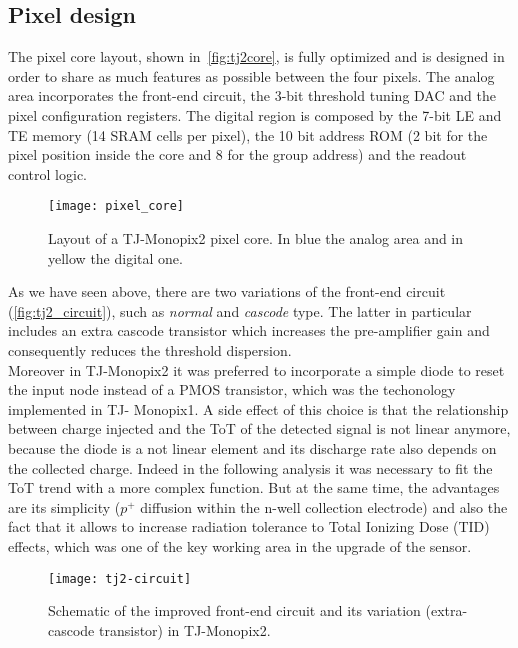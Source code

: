 
\subsection{Pixel design}\label{sec:improved_circuit}

The  pixel core layout, shown in~\autoref{fig:tj2core}, is fully optimized and is designed in order to share as much features as possible between the four pixels. The analog area incorporates the front-end circuit, the 3-bit threshold tuning DAC and the pixel configuration registers. The digital region is composed by the 7-bit LE and TE memory (14 SRAM cells per pixel), the 10 bit address ROM (2 bit for the pixel position inside the core and 8 for the group address) and the readout control logic. 

\begin{figure}[h!]
\centering
\texttt{[image: pixel\_core]}
\caption{Layout of a TJ-Monopix2  pixel core. In blue the analog area and in yellow the digital one.}
\label{fig:tj2core}
\end{figure}


As we have seen above, there are two variations of the front-end circuit (\autoref{fig:tj2_circuit}), such as \textit{normal} and \textit{cascode} type. The latter in particular includes an extra cascode transistor which increases the pre-amplifier gain and consequently reduces the threshold dispersion.\\
Moreover in TJ-Monopix2 it was preferred to incorporate a simple diode to reset the input node instead of a PMOS transistor, which was the techonology implemented in TJ- Monopix1. A side effect of this choice is that the relationship between charge injected and the ToT of the detected signal is not linear anymore, because the diode is a not linear element and its discharge rate also depends on the collected charge. Indeed in the following analysis it was necessary to fit the ToT trend with a more complex function. But at the same time, the advantages are its simplicity ($p^{+}$ diffusion within the n-well collection electrode) and also the fact that it allows to increase radiation tolerance to Total Ionizing Dose (TID) effects, which was one of the key working area in the upgrade of the sensor.


\begin{figure}[h!]
\centering
\texttt{[image: tj2-circuit]}
\caption{Schematic of the improved front-end circuit and its variation (extra-cascode transistor) in TJ-Monopix2.}
\label{fig:tj2_circuit}
\end{figure}


